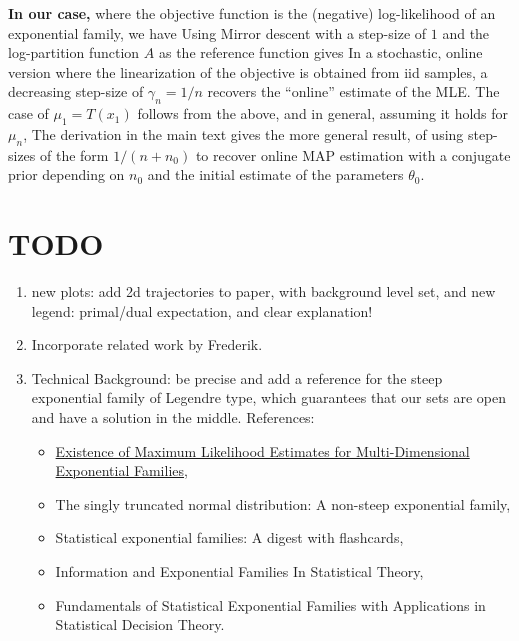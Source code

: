 {\bf In our case,} where the objective function is the (negative) log-likelihood of an exponential family, we have
Using Mirror descent with a step-size of $1$ and the log-partition function $A$ as the reference function gives
In a stochastic, online version 
where the linearization of the objective is obtained from iid samples, 
a decreasing step-size of $\gamma_n = 1/n$ recovers the ``online'' estimate of the MLE.
The case of $\mu_1 = T(x_1)$ follows from the above, 
and in general, assuming it holds for $\mu_n$, 
The derivation in the main text gives the more general result, 
of using step-sizes of the form $1/(n+n_0)$ to recover online MAP estimation 
with a conjugate prior depending on $n_0$ and the initial estimate of the parameters $\theta_0$.

	





\iffalse
\section{TODO}
\begin{enumerate}
	\item new plots: add 2d trajectories to paper, with background level set, and new legend: primal/dual expectation, and clear explanation!
	\item Incorporate related work by Frederik.
	\item Technical Background: be precise and add a reference for the steep exponential family of Legendre type, which guarantees that our sets are open and have a solution in the middle.
	References: \begin{itemize}
		\item \href{https://www.jstor.org/stable/4616462?seq=1#metadata_info_tab_contents}{Existence of Maximum Likelihood Estimates for Multi-Dimensional Exponential Families},
		\item The singly truncated normal distribution: A non-steep exponential family,
		\item Statistical exponential families: A digest with flashcards,
		\item Information and Exponential Families In Statistical Theory,
		\item Fundamentals of Statistical Exponential Families with Applications in Statistical Decision Theory.
	\end{itemize}
\end{enumerate}




